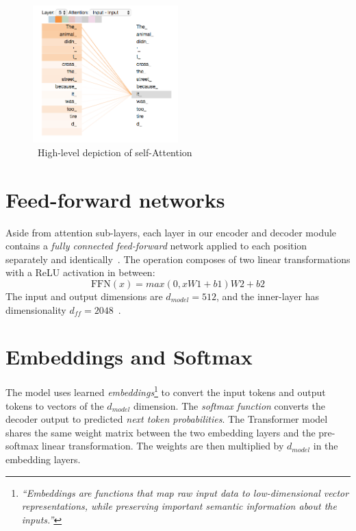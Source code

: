 \begin{figure}
    \centering
    \includegraphics[width=0.5\textwidth]{assets/self-attention}
    \caption{~High-level depiction of self-Attention~\cite{illustrated-transformer}}\label{fig:self-attention}
\end{figure}


\section{Feed-forward networks}\label{sec:feed-forward-networks}

Aside from attention sub-layers, each layer in our encoder and decoder module contains a \textit{fully connected feed-forward} network applied to each position separately and identically~\cite{attention-is-all-you-need}.
The operation composes of two linear transformations with a ReLU activation in between:
\[
    \text{FFN}(x) = max(0, xW1 + b1)W2 + b2
\]
The input and output dimensions are $d_{model} = 512$, and the inner-layer has dimensionality $d_{ff} = 2048$~\cite{attention-is-all-you-need}.


\section{Embeddings and Softmax}\label{sec:embeddings-and-softmax}

The model uses learned \textit{embeddings}\footnote{\textit{``Embeddings are functions that map raw input data to low-dimensional vector representations, while preserving important semantic information about the inputs.''}\cite{embeddings}} to convert the input tokens and output tokens to vectors of the $d_{model}$ dimension.
The \textit{softmax function} converts the decoder output to predicted \textit{next token probabilities}.
The Transformer model shares the same weight matrix between the two embedding layers and the pre-softmax linear transformation.
The weights are then multiplied by $d_{model}$ in the embedding layers.~\cite{attention-is-all-you-need}


